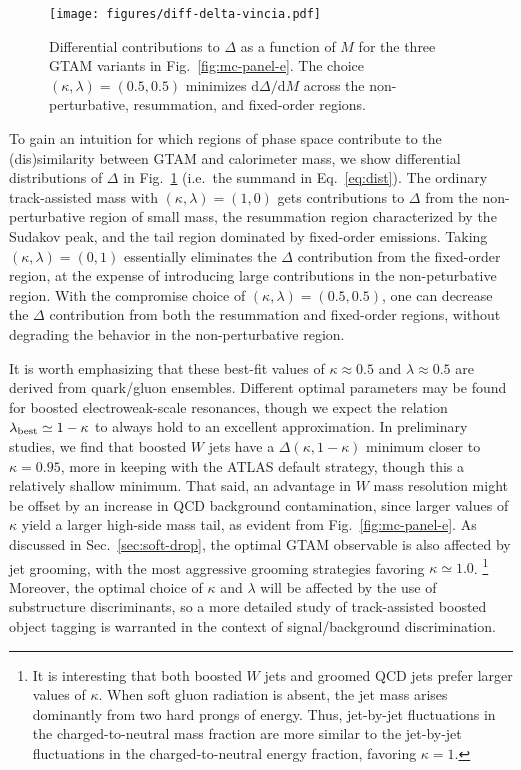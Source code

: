 \documentclass[letterpaper,11pt]{article}
\newcommand{\Fig}[1]{Fig.~\ref{#1}}
\newcommand{\Sec}[1]{Sec.~\ref{#1}}
\newcommand{\Eq}[1]{Eq.~\eqref{#1}}
\begin{document}
\begin{figure}[t]
	\centering
	\texttt{[image: figures/diff-delta-vincia.pdf]}
	\caption{Differential contributions to $\Delta$ as a function of $M$ for the three GTAM variants in \Fig{fig:mc-panel-e}.  The choice $(\kappa, \lambda) = (0.5,0.5)$ minimizes $\text{d} \Delta / \text{d} M$ across the non-perturbative, resummation, and fixed-order regions. 
	}
	\label{fig:differential-delta}
\end{figure}	


To gain an intuition for which regions of phase space contribute to the (dis)similarity between GTAM and calorimeter mass, we show differential distributions of $\Delta$ in \Fig{fig:differential-delta} (i.e.\ the summand in \Eq{eq:dist}).
%
The ordinary track-assisted mass with $(\kappa, \lambda) = (1,0)$ gets contributions to $\Delta$ from the non-perturbative region of small mass, the resummation region characterized by the Sudakov peak, and the tail region dominated by fixed-order emissions.
%
Taking $(\kappa, \lambda) = (0,1)$ essentially eliminates the $\Delta$ contribution from the fixed-order region, at the expense of introducing large contributions in the non-peturbative region.
%
With the compromise choice of $(\kappa, \lambda) = (0.5,0.5)$, one can decrease the $\Delta$ contribution from both the resummation and fixed-order regions, without degrading the behavior in the non-perturbative region.


It is worth emphasizing that these best-fit values of $\kappa \approx 0.5$ and $\lambda \approx 0.5$ are derived from quark/gluon ensembles.
%
Different optimal parameters may be found for boosted electroweak-scale resonances, though we expect the relation $\lambda_{\rm best} \simeq 1-\kappa$ to always hold to an excellent approximation.
%
In preliminary studies, we find that boosted $W$ jets have a $\Delta(\kappa,1-\kappa)$ minimum closer to $\kappa = 0.95$, more in keeping with the ATLAS default strategy, though this a relatively shallow minimum.
%
That said, an advantage in $W$ mass resolution might be offset by an increase in QCD background contamination, since larger values of $\kappa$ yield a larger high-side mass tail, as evident from \Fig{fig:mc-panel-e}.
%
As discussed in \Sec{sec:soft-drop}, the optimal GTAM observable is also affected by jet grooming, with the most aggressive grooming strategies favoring $\kappa \simeq 1.0$.%
%
\footnote{It is interesting that both boosted $W$ jets and groomed QCD jets prefer larger values of $\kappa$.  When soft gluon radiation is absent, the jet mass arises dominantly from two hard prongs of energy.  Thus, jet-by-jet fluctuations in the charged-to-neutral mass fraction are more similar to the jet-by-jet fluctuations in the charged-to-neutral energy fraction, favoring $\kappa = 1$.}
%
Moreover, the optimal choice of $\kappa$ and $\lambda$ will be affected by the use of substructure discriminants, so a more detailed study of track-assisted boosted object tagging is warranted in the context of signal/background discrimination.
\end{document}
